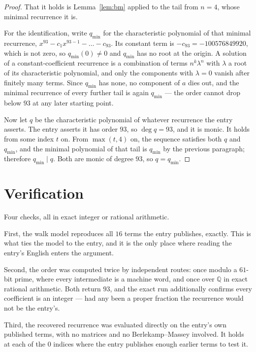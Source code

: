\documentclass[11pt,a4paper]{article}
\theoremstyle{plain}
\theoremstyle{definition}
\begin{document}
\begin{proof}
That it holds is Lemma~\ref{lem:bm} applied to the tail from $n=4$, whose minimal
recurrence it is.

For the identification, write $q_{\min}$ for the characteristic polynomial of that minimal
recurrence, $x^{93}-c_1x^{93-1}-\dots-c_{93}$. Its constant term is
$-c_{93}=-100576849920$, which is not zero, so $q_{\min}(0)\neq0$ and $q_{\min}$ has no
root at the origin. A solution of a constant-coefficient recurrence is a combination of terms
$n^{k}\lambda^{n}$ with $\lambda$ a root of its characteristic polynomial, and only the
components with $\lambda=0$ vanish after finitely many terms. Since $q_{\min}$ has none, no
component of $a$ dies out, and the minimal recurrence of every further tail is again
$q_{\min}$ --- the order cannot drop below $93$ at any later starting point.

Now let $q$ be the characteristic polynomial of whatever recurrence the entry asserts. The
entry asserts it has order $93$, so $\deg q=93$, and it is monic. It holds from some
index $t$ on. From $\max(t,4)$ on, the sequence satisfies both $q$ and $q_{\min}$, and
the minimal polynomial of that tail is $q_{\min}$ by the previous paragraph; therefore
$q_{\min}\mid q$. Both are monic of degree $93$, so $q=q_{\min}$.
\end{proof}

\section{Verification}

Four checks, all in exact integer or rational arithmetic.

First, the walk model reproduces all $16$ terms the entry publishes, exactly. This is
what ties the model to the entry, and it is the only place where reading the entry's English
enters the argument.

Second, the order was computed twice by independent routes: once modulo a $61$-bit prime, where
every intermediate is a machine word, and once over $\mathbb{Q}$ in exact rational arithmetic.
Both return $93$, and the exact run additionally confirms every coefficient is an integer
--- had any been a proper fraction the recurrence would not be the entry's.

Third, the recovered recurrence was evaluated directly on the entry's own published terms, with
no matrices and no Berlekamp--Massey involved. It holds at each of the $0$ indices where
the entry publishes enough earlier terms to test it.
\end{document}
